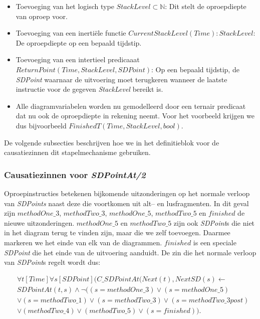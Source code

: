 \begin{itemize}
	\item Toevoeging van het logisch type $StackLevel \subset \mathbb{N}$: Dit stelt de oproepdiepte van oproep voor.
	\item Toevoeging van een inerti\"ele functie $CurrentStackLevel(Time) : StackLevel$: De oproepdiepte op een bepaald tijdstip.
	\item Toevoeging van een intertieel predicaaat \\ $ReturnPoint(Time, StackLevel, SDPoint)$: Op een bepaald tijdstip, de \textit{SDPoint} waarnaar de uitvoering moet terugkeren wanneer de laatste instructie voor de gegeven \textit{StackLevel} bereikt is.
	\item Alle diagramvariabelen worden nu gemodelleerd door een ternair predicaat dat nu ook de oproepdiepte in rekening neemt. Voor het voorbeeld krijgen we dus bijvoorbeeld $FinishedT(Time, StackLevel, bool)$.
\end{itemize}

De volgende subsecties beschrijven hoe we in het definitieblok voor de causatiezinnen dit stapelmechanisme gebruiken.

\subsubsection{Causatiezinnen voor \textit{SDPointAt/2}}\label{sec:sd-rec-cause}
Oproepinstructies betekenen bijkomende uitzonderingen op het normale verloop van \textit{SDPoints} naast deze die voortkomen uit alt-- en lusfragmenten. In dit geval zijn $methodOne\_3$, $methodTwo\_3$, $methodOne\_5$, $methodTwo\_5$ en $finished$ de nieuwe uitzonderingen. $methodOne\_5$ en $methodTwo\_5$ zijn ook \textit{SDPoint}s die niet in het diagram terug te vinden zijn, maar die we zelf toevoegen. Daarmee markeren we het einde van elk van de diagrammen. $finished$ is een speciale \textit{SDPoint} die het einde van de uitvoering aanduidt. De zin die het normale verloop van \textit{SDPoint}s regelt wordt dus:

\begin{align}
	& \nonumber \forall{t}[Time]\forall{s}[SDPoint](C\_SDPointAt(Next(t), NextSD(s) \leftarrow \\ \nonumber &SDPointAt(t,s) \land \lnot((s = methodOne\_3) \lor (s = methodOne\_5) \\ \nonumber &\lor (s = methodTwo\_1) \lor (s = methodTwo\_3) \lor (s = methodTwo\_3post) \\ &\lor (methodTwo\_4) \lor (methodTwo\_5) \lor (s = finished)).
\end{align}


